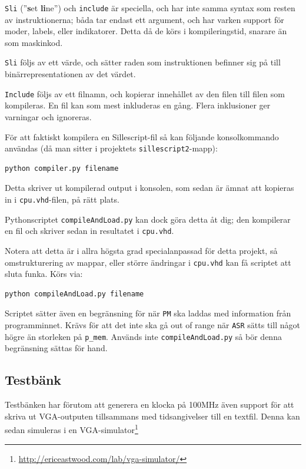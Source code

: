 \documentclass[]{article}
\begin{document}
\noindent
\texttt{Sli} (''\textbf{s}et \textbf{li}ne'') och \texttt{include} är speciella, och har inte samma syntax som resten av instruktionerna; båda tar endast ett argument, och har varken support för moder, labels, eller indikatorer. Detta då de körs i kompileringstid, snarare än som maskinkod.

\texttt{Sli} följs av ett värde, och sätter raden som instruktionen befinner sig på till binärrepresentationen av det värdet.

\texttt{Include} följs av ett filnamn, och kopierar innehållet av den filen till filen som kompileras. En fil kan som mest inkluderas en gång. Flera inklusioner ger varningar och ignoreras.

För att faktiskt kompilera en Sillescript-fil så kan följande konsolkommando användas (då man sitter i projektets \texttt{sillescript2}-mapp):\\

\begin{Verbatim}[frame=single]
python compiler.py filename
\end{Verbatim}

\noindent
Detta skriver ut kompilerad output i konsolen, som sedan är ämnat att kopieras in i \texttt{cpu.vhd}-filen, på rätt plats. 

Pythonscriptet \texttt{compileAndLoad.py} kan dock göra detta åt dig; den kompilerar en fil och skriver sedan in resultatet i \texttt{cpu.vhd}. 

Notera att detta är i allra högsta grad specialanpassad för detta projekt, så omstrukturering av mappar, eller större ändringar i \texttt{cpu.vhd} kan få scriptet att sluta funka. Körs via:\\

\begin{Verbatim}[frame=single]
python compileAndLoad.py filename
\end{Verbatim}

\noindent
Scriptet sätter även en begränsning för när \texttt{PM} ska laddas med information från programminnet. Krävs för att det inte ska gå out of range när \texttt{ASR} sätts till något högre än storleken på \texttt{p\_mem}. Används inte \texttt{compileAndLoad.py} så bör denna begränsning sättas för hand.

\subsection{Testbänk}
Testbänken har förutom att generera en klocka på 100MHz även support för att skriva ut VGA-outputen tillsammans med tidsangivelser till en textfil. Denna kan sedan simuleras i en VGA-simulator\footnote{\href{http://ericeastwood.com/lab/vga-simulator/}{\url{http://ericeastwood.com/lab/vga-simulator/}}}
\end{document}

